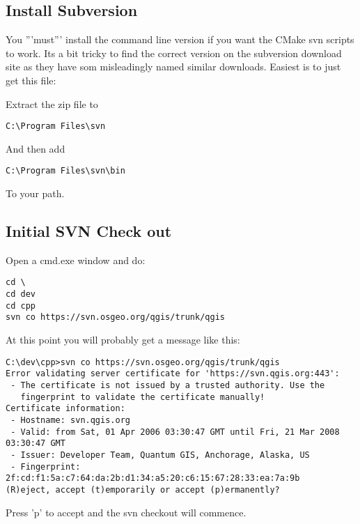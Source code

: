 \subsection{Install Subversion}
You '''must''' install the command line version if you want the CMake svn scripts to work.
Its a bit tricky to find the correct version on the subversion download site as they have 
som misleadingly named similar downloads. Easiest is to just get this file:


Extract the zip file to
\begin{verbatim}
C:\Program Files\svn
\end{verbatim}

And then add

\begin{verbatim}
C:\Program Files\svn\bin
\end{verbatim}

To your path.

\subsection{Initial SVN Check out}
Open a cmd.exe window and do:

\begin{verbatim}
cd \
cd dev
cd cpp
svn co https://svn.osgeo.org/qgis/trunk/qgis 
\end{verbatim}

At this point you will probably get a message like this:

\begin{verbatim}
C:\dev\cpp>svn co https://svn.osgeo.org/qgis/trunk/qgis
Error validating server certificate for 'https://svn.qgis.org:443':
 - The certificate is not issued by a trusted authority. Use the
   fingerprint to validate the certificate manually!
Certificate information:
 - Hostname: svn.qgis.org
 - Valid: from Sat, 01 Apr 2006 03:30:47 GMT until Fri, 21 Mar 2008 03:30:47 GMT
 - Issuer: Developer Team, Quantum GIS, Anchorage, Alaska, US
 - Fingerprint: 2f:cd:f1:5a:c7:64:da:2b:d1:34:a5:20:c6:15:67:28:33:ea:7a:9b
(R)eject, accept (t)emporarily or accept (p)ermanently?
\end{verbatim}

Press 'p' to accept and the svn checkout will commence.

